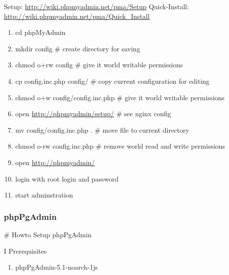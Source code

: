 \documentclass[letterpaper,10pt,english]{sphinxmanual}
\begin{document}
Setup: \href{http://wiki.phpmyadmin.net/pma/Setup}{http://wiki.phpmyadmin.net/pma/Setup}
Quick-Install: \href{http://wiki.phpmyadmin.net/pma/Quick\_Install}{http://wiki.phpmyadmin.net/pma/Quick\_Install}
\begin{enumerate}
\item {} 
cd phpMyAdmin

\item {} 
mkdir config                        \# create directory for saving

\item {} 
chmod o+rw config                   \# give it world writable permissions

\item {} 
cp config.inc.php config/           \# copy current configuration for editing

\item {} 
chmod o+w config/config.inc.php     \# give it world writable permissions

\item {} 
open \href{http://phpmyadmin/setup/}{http://phpmyadmin/setup/}       \# see nginx config

\item {} 
mv config/config.inc.php .          \# move file to current directory

\item {} 
chmod o-rw config.inc.php           \# remove world read and write permissions

\item {} 
open \href{http://phpmyadmin/}{http://phpmyadmin/}

\item {} 
login with root login and password

\item {} 
start adminstration

\end{enumerate}


\subsubsection{phpPgAdmin}
\label{sdocs/databases/phpPgAdmin/phpPgAdmin::doc}\label{sdocs/databases/phpPgAdmin/phpPgAdmin:phppgadmin}
\# Howto Setup phpPgAdmin

I Prerequisites
\begin{enumerate}
\item {} 
phpPgAdmin-5.1-noarch-1js

\end{enumerate}
\end{document}
